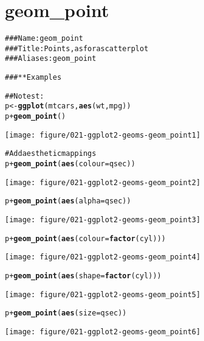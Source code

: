 \documentclass[a4paper,titlepage]{tufte-handout}\usepackage{graphicx, color}
\makeatletter
\def\maxwidth{ %
  \ifdim\Gin@nat@width>\linewidth
    \linewidth
  \else
    \Gin@nat@width
  \fi
}
\newcommand{\hlfunctioncall}[1]{\textcolor[rgb]{0.501960784313725,0,0.329411764705882}{\textbf{#1}}}%
\newcommand{\hlcomment}[1]{\textcolor[rgb]{0.180392156862745,0.6,0.341176470588235}{#1}}%
\newenvironment{kframe}{%
 \def\at@end@of@kframe{}%
 \ifinner\ifhmode%
  \def\at@end@of@kframe{\end{minipage}}%
  \begin{minipage}{\columnwidth}%
 \fi\fi%
 \def\FrameCommand##1{\hskip\@totalleftmargin \hskip-\fboxsep
 \colorbox{shadecolor}{##1}\hskip-\fboxsep
     \hskip-\linewidth \hskip-\@totalleftmargin \hskip\columnwidth}%
 \MakeFramed {\advance\hsize-\width
   \@totalleftmargin\z@ \linewidth\hsize
   \@setminipage}}%
 {\par\unskip\endMakeFramed%
 \at@end@of@kframe}
\newenvironment{knitrout}{}{} %
\makeatother
\begin{document}
\section{geom\_point}

\begin{knitrout}
\color{fgcolor}\begin{kframe}
\begin{alltt}
\hlcomment{### Name: geom_point}
\hlcomment{### Title: Points, as for a scatterplot}
\hlcomment{### Aliases: geom_point}

\hlcomment{### ** Examples}

\hlcomment{## No test: }
p <- \hlfunctioncall{ggplot}(mtcars, \hlfunctioncall{aes}(wt, mpg))
p + \hlfunctioncall{geom_point}()
\end{alltt}
\end{kframe}
\texttt{[image: figure/021-ggplot2-geoms-geom\_point1]} 
\begin{kframe}\begin{alltt}

\hlcomment{# Add aesthetic mappings}
p + \hlfunctioncall{geom_point}(\hlfunctioncall{aes}(colour = qsec))
\end{alltt}
\end{kframe}
\texttt{[image: figure/021-ggplot2-geoms-geom\_point2]} 
\begin{kframe}\begin{alltt}
p + \hlfunctioncall{geom_point}(\hlfunctioncall{aes}(alpha = qsec))
\end{alltt}
\end{kframe}
\texttt{[image: figure/021-ggplot2-geoms-geom\_point3]} 
\begin{kframe}\begin{alltt}
p + \hlfunctioncall{geom_point}(\hlfunctioncall{aes}(colour = \hlfunctioncall{factor}(cyl)))
\end{alltt}
\end{kframe}
\texttt{[image: figure/021-ggplot2-geoms-geom\_point4]} 
\begin{kframe}\begin{alltt}
p + \hlfunctioncall{geom_point}(\hlfunctioncall{aes}(shape = \hlfunctioncall{factor}(cyl)))
\end{alltt}
\end{kframe}
\texttt{[image: figure/021-ggplot2-geoms-geom\_point5]} 
\begin{kframe}\begin{alltt}
p + \hlfunctioncall{geom_point}(\hlfunctioncall{aes}(size = qsec))
\end{alltt}
\end{kframe}
\texttt{[image: figure/021-ggplot2-geoms-geom\_point6]} 
\begin{kframe}\begin{alltt}


\end{alltt}
\end{kframe}
\end{knitrout}
\end{document}

